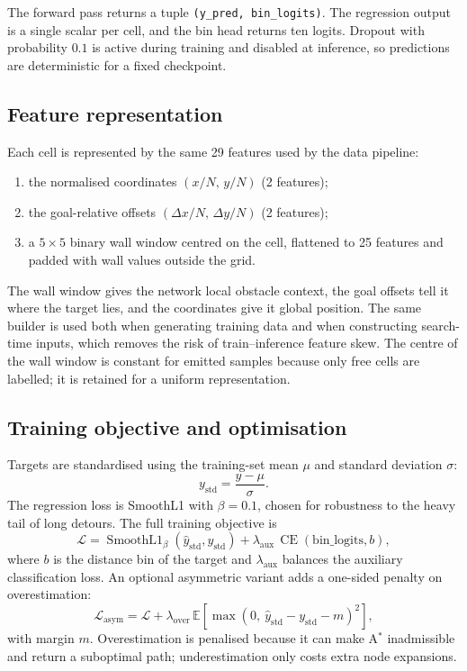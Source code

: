 The forward pass returns a tuple \texttt{(y\_pred, bin\_logits)}. The regression
output is a single scalar per cell, and the bin head returns ten logits. Dropout
with probability $0.1$ is active during training and disabled at inference, so
predictions are deterministic for a fixed checkpoint.

\subsection{Feature representation}
Each cell is represented by the same 29 features used by the data pipeline:
\begin{enumerate}
  \item the normalised coordinates $(x/N,\,y/N)$ (2 features);
  \item the goal-relative offsets $(\Delta x/N,\,\Delta y/N)$ (2 features);
  \item a $5\times5$ binary wall window centred on the cell, flattened to 25
  features and padded with wall values outside the grid.
\end{enumerate}
The wall window gives the network local obstacle context, the goal offsets tell
it where the target lies, and the coordinates give it global position. The same
builder is used both when generating training data and when constructing
search-time inputs, which removes the risk of train--inference feature skew.
The centre of the wall window is constant for emitted samples because only free
cells are labelled; it is retained for a uniform representation.

\subsection{Training objective and optimisation}
Targets are standardised using the training-set mean $\mu$ and standard
deviation $\sigma$:
\begin{equation}
  y_{\text{std}} = \frac{y-\mu}{\sigma}.
\end{equation}
The regression loss is SmoothL1 with $\beta=0.1$, chosen for robustness to the
heavy tail of long detours. The full training objective is
\begin{equation}
  \mathcal{L}
  = \operatorname{SmoothL1}_\beta(\hat{y}_{\text{std}}, y_{\text{std}})
  + \lambda_{\text{aux}}\,\operatorname{CE}(\text{bin\_logits}, b),
\end{equation}
where $b$ is the distance bin of the target and $\lambda_{\text{aux}}$ balances
the auxiliary classification loss. An optional asymmetric variant adds a
one-sided penalty on overestimation:
\begin{equation}
  \mathcal{L}_{\text{asym}}
  = \mathcal{L}
  + \lambda_{\text{over}}\,\mathbb{E}\!\left[
      \max(0,\ \hat{y}_{\text{std}} - y_{\text{std}} - m)^2
    \right],
\end{equation}
with margin $m$. Overestimation is penalised because it can make A$^\ast$
inadmissible and return a suboptimal path; underestimation only costs extra
node expansions.

